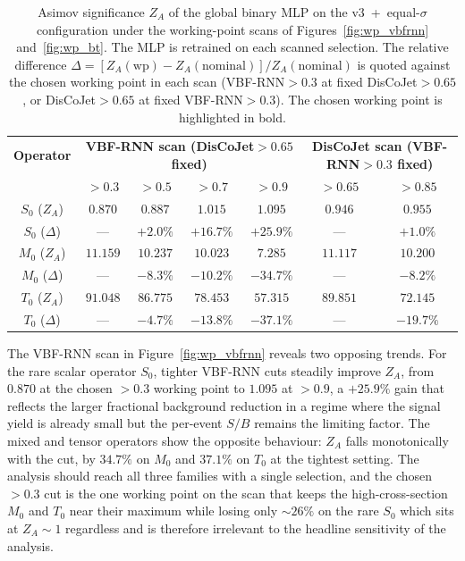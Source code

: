 \begin{table}[htbp]
  \centering
  \caption{Asimov significance $Z_A$ of the global binary MLP on the v3~+~equal-$\sigma$ configuration under the working-point scans of Figures~\ref{fig:wp_vbfrnn} and~\ref{fig:wp_bt}. The MLP is retrained on each scanned selection. The relative difference $\Delta = [Z_A(\text{wp}) - Z_A(\text{nominal})]/Z_A(\text{nominal})$ is quoted against the chosen working point in each scan (VBF-RNN${}>0.3$ at fixed DisCoJet${}>0.65$, or DisCoJet${}>0.65$ at fixed VBF-RNN${}>0.3$). The chosen working point is highlighted in bold.}
  \label{tab:wp_scan}
  \begin{tabular}{|c|c|c|c|c|c|c|}
    \hline
    \textbf{Operator} & \multicolumn{4}{c|}{\textbf{VBF-RNN scan (DisCoJet${}>0.65$ fixed)}} & \multicolumn{2}{c|}{\textbf{DisCoJet scan (VBF-RNN${}>0.3$ fixed)}} \\
                       & ${>}0.3$ & ${>}0.5$ & ${>}0.7$ & ${>}0.9$ & ${>}0.65$ & ${>}0.85$ \\
    \hline
    $S_0$ ($Z_A$)      & $\mathbf{0.870}$    & $0.887$   & $1.015$   & $1.095$   & $\mathbf{0.946}$   & $0.955$   \\
    $S_0$ ($\Delta$)   & ---                  & $+2.0\%$  & $+16.7\%$ & $+25.9\%$ & ---                 & $+1.0\%$  \\
    \hline
    $M_0$ ($Z_A$)      & $\mathbf{11.159}$   & $10.237$  & $10.023$  & $7.285$   & $\mathbf{11.117}$  & $10.200$  \\
    $M_0$ ($\Delta$)   & ---                  & $-8.3\%$  & $-10.2\%$ & $-34.7\%$ & ---                 & $-8.2\%$  \\
    \hline
    $T_0$ ($Z_A$)      & $\mathbf{91.048}$   & $86.775$  & $78.453$  & $57.315$  & $\mathbf{89.851}$  & $72.145$  \\
    $T_0$ ($\Delta$)   & ---                  & $-4.7\%$  & $-13.8\%$ & $-37.1\%$ & ---                 & $-19.7\%$ \\
    \hline
  \end{tabular}
\end{table}

The VBF-RNN scan in Figure~\ref{fig:wp_vbfrnn} reveals two opposing trends. For the rare scalar operator $S_0$, tighter VBF-RNN cuts steadily improve $Z_A$, from $0.870$ at the chosen ${>}0.3$ working point to $1.095$ at ${>}0.9$, a $+25.9\%$ gain that reflects the larger fractional background reduction in a regime where the signal yield is already small but the per-event $S/B$ remains the limiting factor. The mixed and tensor operators show the opposite behaviour: $Z_A$ falls monotonically with the cut, by $34.7\%$ on $M_0$ and $37.1\%$ on $T_0$ at the tightest setting. The analysis should reach all three families with a single selection, and the chosen ${>}0.3$ cut is the one working point on the scan that keeps the high-cross-section $M_0$ and $T_0$ near their maximum while losing only $\sim$$26\%$ on the rare $S_0$ which sits at $Z_A\sim 1$ regardless and is therefore irrelevant to the headline sensitivity of the analysis.

